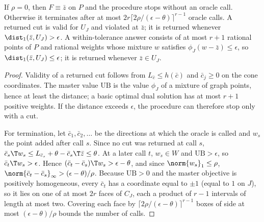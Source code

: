 \begin{theorem}\label{thm:weak-separation}
If $\rho=0$, then $F\equiv\bar z$ on $P$ and the procedure stops without an
oracle call. Otherwise it terminates after at most
$2r\lceil2\rho/(\epsilon-\theta)\rceil^{r-1}$ oracle calls. A returned cut is valid
for $U_J$ and violated at $\bar z$; it is returned whenever
$\dist_1(\bar z,U_J)>\epsilon$. A within-tolerance answer consists of at most
$r+1$ rational points of $P$ and rational weights whose mixture $w$ satisfies
$\phi_J(w-\bar z)\le\epsilon$, so $\dist_1(\bar z,U_J)\le\epsilon$; it is returned
whenever $\bar z\in U_J$.
\end{theorem}

\begin{proof}
Validity of a returned cut follows from $L_{\bar c}\le h(\bar c)$ and
$\bar c_j\ge0$ on the cone coordinates. The master value $\mathrm{UB}$ is the
value $\phi_J$ of a mixture of graph points, hence at least the distance; a
basic optimal dual solution has at most $r+1$ positive weights. If the
distance exceeds $\epsilon$, the procedure can therefore stop only with a cut.

For termination, let $\bar c_1,\bar c_2,\dots$ be the directions at which the
oracle is called and $w_s$ the point added after call $s$. Since no cut was
returned at call $s$, $\bar c_s\T w_s\le L_{\bar c_s}+\theta-\bar c_s\T\bar z\le\theta$.
At a later call $t$, $w_s\in W$ and $\mathrm{UB}>\epsilon$, so $\bar c_t\T w_s>\epsilon$.
Hence $(\bar c_t-\bar c_s)\T w_s>\epsilon-\theta$, and since $\norm{w_s}_1\le\rho$,
$\norm{\bar c_t-\bar c_s}_\infty>(\epsilon-\theta)/\rho$. Because $\mathrm{UB}>0$ and
the master objective is positively homogeneous, every $\bar c_t$ has a
coordinate equal to $\pm1$ (equal to $1$ on $J$), so it lies on one of at most
$2r$ faces of $C_J$, each a product of $r-1$ intervals of length at most two.
Covering each face by $\lceil2\rho/(\epsilon-\theta)\rceil^{r-1}$ boxes of side at
most $(\epsilon-\theta)/\rho$ bounds the number of calls.
\end{proof}

